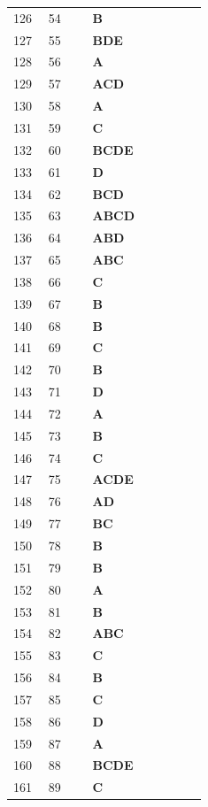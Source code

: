 \documentclass[UTF8,fontset=windows,11pt]{ctexart}
\begin{document}
\begin{longtable}{p{0.16\linewidth}p{0.2\linewidth}p{0.52\linewidth}}
126 & 54 & \textbf{\textcolor{answergreen}{B}} \\
127 & 55 & \textbf{\textcolor{answergreen}{BDE}} \\
128 & 56 & \textbf{\textcolor{answergreen}{A}} \\
129 & 57 & \textbf{\textcolor{answergreen}{ACD}} \\
130 & 58 & \textbf{\textcolor{answergreen}{A}} \\
131 & 59 & \textbf{\textcolor{answergreen}{C}} \\
132 & 60 & \textbf{\textcolor{answergreen}{BCDE}} \\
133 & 61 & \textbf{\textcolor{answergreen}{D}} \\
134 & 62 & \textbf{\textcolor{answergreen}{BCD}} \\
135 & 63 & \textbf{\textcolor{answergreen}{ABCD}} \\
136 & 64 & \textbf{\textcolor{answergreen}{ABD}} \\
137 & 65 & \textbf{\textcolor{answergreen}{ABC}} \\
138 & 66 & \textbf{\textcolor{answergreen}{C}} \\
139 & 67 & \textbf{\textcolor{answergreen}{B}} \\
140 & 68 & \textbf{\textcolor{answergreen}{B}} \\
141 & 69 & \textbf{\textcolor{answergreen}{C}} \\
142 & 70 & \textbf{\textcolor{answergreen}{B}} \\
143 & 71 & \textbf{\textcolor{answergreen}{D}} \\
144 & 72 & \textbf{\textcolor{answergreen}{A}} \\
145 & 73 & \textbf{\textcolor{answergreen}{B}} \\
146 & 74 & \textbf{\textcolor{answergreen}{C}} \\
147 & 75 & \textbf{\textcolor{answergreen}{ACDE}} \\
148 & 76 & \textbf{\textcolor{answergreen}{AD}} \\
149 & 77 & \textbf{\textcolor{answergreen}{BC}} \\
150 & 78 & \textbf{\textcolor{answergreen}{B}} \\
151 & 79 & \textbf{\textcolor{answergreen}{B}} \\
152 & 80 & \textbf{\textcolor{answergreen}{A}} \\
153 & 81 & \textbf{\textcolor{answergreen}{B}} \\
154 & 82 & \textbf{\textcolor{answergreen}{ABC}} \\
155 & 83 & \textbf{\textcolor{answergreen}{C}} \\
156 & 84 & \textbf{\textcolor{answergreen}{B}} \\
157 & 85 & \textbf{\textcolor{answergreen}{C}} \\
158 & 86 & \textbf{\textcolor{answergreen}{D}} \\
159 & 87 & \textbf{\textcolor{answergreen}{A}} \\
160 & 88 & \textbf{\textcolor{answergreen}{BCDE}} \\
161 & 89 & \textbf{\textcolor{answergreen}{C}} \\
\end{longtable}
\end{document}
